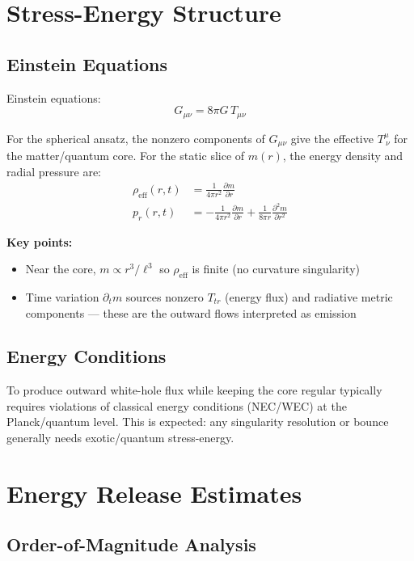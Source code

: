 \documentclass[11pt,a4paper]{article}
\begin{document}
\section{Stress-Energy Structure}

\subsection{Einstein Equations}

Einstein equations:
\begin{equation}
G_{\mu\nu} = 8\pi G \, T_{\mu\nu}
\end{equation}

For the spherical ansatz, the nonzero components of $G_{\mu\nu}$ give the effective $T^\mu_{\ \nu}$ for the matter/quantum core. For the static slice of $m(r)$, the energy density and radial pressure are:
\begin{align}
\rho_{\text{eff}}(r,t) &= \frac{1}{4\pi r^2}\frac{\partial m}{\partial r} \\
p_r(r,t) &= -\frac{1}{4\pi r^2}\frac{\partial m}{\partial r} + \frac{1}{8\pi r}\frac{\partial^2 m}{\partial r^2}
\end{align}

\textbf{Key points:}
\begin{itemize}
\item Near the core, $m\propto r^3/\ell^3$ so $\rho_{\text{eff}}$ is finite (no curvature singularity)
\item Time variation $\partial_t m$ sources nonzero $T_{t r}$ (energy flux) and radiative metric components --- these are the outward flows interpreted as emission
\end{itemize}

\subsection{Energy Conditions}

To produce outward white-hole flux while keeping the core regular typically requires violations of classical energy conditions (NEC/WEC) at the Planck/quantum level. This is expected: any singularity resolution or bounce generally needs exotic/quantum stress-energy.

\section{Energy Release Estimates}

\subsection{Order-of-Magnitude Analysis}
\end{document}
